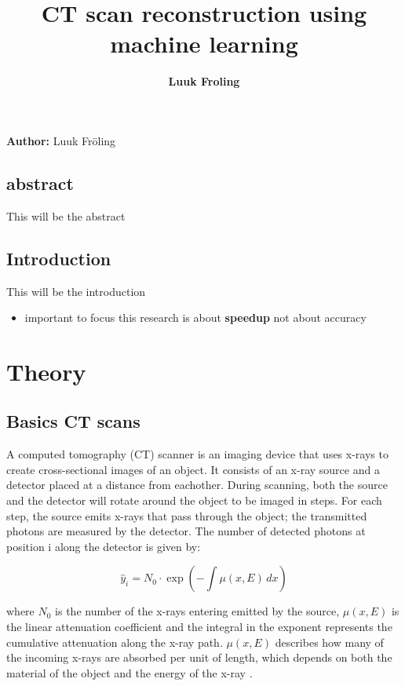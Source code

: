 \documentclass{article}
\title{CT scan reconstruction using machine learning}
\date{\displaydate{articleDate}}
\author{\bfseries Luuk Froling\mdseries\\}
\begin{document}
\maketitle
{}

\textbf{Author:} Luuk Fröling

\subsection{abstract}

This will be the abstract

\subsection{Introduction}

This will be the introduction

\begin{itemize}
\item important to focus this research is about \textbf{speedup} not about accuracy
\end{itemize}

\section{Theory}

\subsection{Basics CT scans}

A computed tomography (CT) scanner is an imaging device that uses x-rays to create cross-sectional images of an object. It consists of an x-ray source and a detector placed at a distance from eachother. During scanning, both the source and the detector will rotate around the object to be imaged in steps. For each step, the source emits x-rays that pass through the object; the transmitted photons are measured by the detector. The number of detected photons at position i along the detector is given by:

\begin{equation}
\label{first }
\hat{y}_i  = N_0 \cdot \exp\left(-\int \mu(x, E) \, dx\right)
\end{equation}

where $N_0$ is the number of the x-rays entering emitted by the source, $\mu(x, E)$ is the linear attenuation coefficient and the integral in the exponent represents the cumulative attenuation along the x-ray path. $\mu(x, E)$ describes how many of the incoming x-rays are absorbed per unit of length, which depends on both the material of the object and the energy of the x-ray \citep{kamalian2016ct_principles}.
\end{document}

